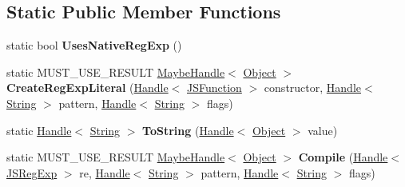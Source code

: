 \subsection*{Static Public Member Functions}
\begin{DoxyCompactItemize}
\item 
\hypertarget{classv8_1_1internal_1_1_reg_exp_impl_a1f036a7e906cecf51692e724a54cbcec}{}static bool {\bfseries Uses\+Native\+Reg\+Exp} ()\label{classv8_1_1internal_1_1_reg_exp_impl_a1f036a7e906cecf51692e724a54cbcec}

\item 
\hypertarget{classv8_1_1internal_1_1_reg_exp_impl_a8f905b35843ae24771769dcddb6f3c5f}{}static M\+U\+S\+T\+\_\+\+U\+S\+E\+\_\+\+R\+E\+S\+U\+L\+T \hyperlink{classv8_1_1internal_1_1_maybe_handle}{Maybe\+Handle}$<$ \hyperlink{classv8_1_1internal_1_1_object}{Object} $>$ {\bfseries Create\+Reg\+Exp\+Literal} (\hyperlink{classv8_1_1internal_1_1_handle}{Handle}$<$ \hyperlink{classv8_1_1internal_1_1_j_s_function}{J\+S\+Function} $>$ constructor, \hyperlink{classv8_1_1internal_1_1_handle}{Handle}$<$ \hyperlink{classv8_1_1internal_1_1_string}{String} $>$ pattern, \hyperlink{classv8_1_1internal_1_1_handle}{Handle}$<$ \hyperlink{classv8_1_1internal_1_1_string}{String} $>$ flags)\label{classv8_1_1internal_1_1_reg_exp_impl_a8f905b35843ae24771769dcddb6f3c5f}

\item 
\hypertarget{classv8_1_1internal_1_1_reg_exp_impl_a86680c63f2568adcd0c136024d05ea85}{}static \hyperlink{classv8_1_1internal_1_1_handle}{Handle}$<$ \hyperlink{classv8_1_1internal_1_1_string}{String} $>$ {\bfseries To\+String} (\hyperlink{classv8_1_1internal_1_1_handle}{Handle}$<$ \hyperlink{classv8_1_1internal_1_1_object}{Object} $>$ value)\label{classv8_1_1internal_1_1_reg_exp_impl_a86680c63f2568adcd0c136024d05ea85}

\item 
\hypertarget{classv8_1_1internal_1_1_reg_exp_impl_afefb764af57c36a4f6f60a348f3ab04e}{}static M\+U\+S\+T\+\_\+\+U\+S\+E\+\_\+\+R\+E\+S\+U\+L\+T \hyperlink{classv8_1_1internal_1_1_maybe_handle}{Maybe\+Handle}$<$ \hyperlink{classv8_1_1internal_1_1_object}{Object} $>$ {\bfseries Compile} (\hyperlink{classv8_1_1internal_1_1_handle}{Handle}$<$ \hyperlink{classv8_1_1internal_1_1_j_s_reg_exp}{J\+S\+Reg\+Exp} $>$ re, \hyperlink{classv8_1_1internal_1_1_handle}{Handle}$<$ \hyperlink{classv8_1_1internal_1_1_string}{String} $>$ pattern, \hyperlink{classv8_1_1internal_1_1_handle}{Handle}$<$ \hyperlink{classv8_1_1internal_1_1_string}{String} $>$ flags)\label{classv8_1_1internal_1_1_reg_exp_impl_afefb764af57c36a4f6f60a348f3ab04e}


\end{DoxyCompactItemize}
